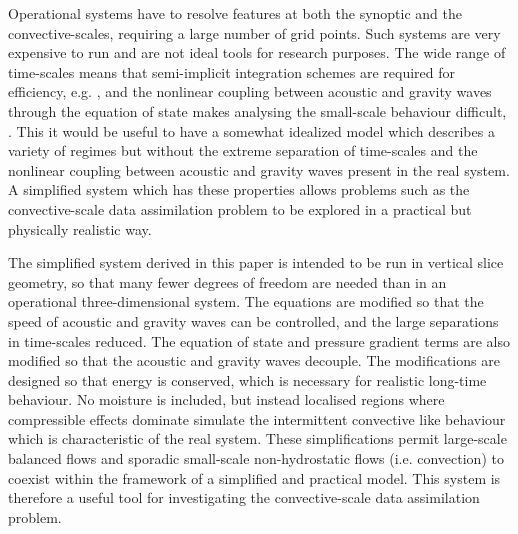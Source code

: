 \documentclass[times]{qjrms4}
\begin{document}

Operational systems have to resolve features at both the synoptic and the convective-scales, 
requiring a large number of grid points.  
Such systems are very expensive to run and are not ideal tools for research purposes. The wide range of time-scales means that semi-implicit integration schemes are required for efficiency, e.g. \citep{davies_2005}, and the nonlinear coupling between acoustic and gravity waves through the equation of state makes analysing the small-scale behaviour difficult, \citep{thuburn1}. This it would be useful to have a somewhat idealized model which describes a variety of regimes but without the extreme separation of time-scales and the nonlinear coupling between acoustic and gravity waves present in the real system. 
A simplified system which has these properties allows problems such as the convective-scale 
data assimilation problem to be explored in a practical but physically
realistic way.

The simplified system derived in this paper is intended to be run in vertical slice geometry, so that many fewer degrees of freedom are needed than in an operational three-dimensional system. The equations are modified so that the speed of acoustic and gravity waves can be controlled, and the large separations in time-scales reduced. The equation of state and pressure gradient terms are also modified so that the acoustic and gravity waves decouple. The modifications are designed so that energy is conserved, which is necessary for realistic long-time behaviour. No moisture is included, but instead localised regions where compressible effects dominate simulate the intermittent convective like behaviour which is characteristic of 
the real system.  
These simplifications permit large-scale balanced flows and sporadic small-scale non-hydrostatic 
flows (i.e. convection) to coexist within the framework of a simplified and practical model. 
This system is therefore a useful tool for investigating the convective-scale 
data assimilation problem. 
\end{document}
